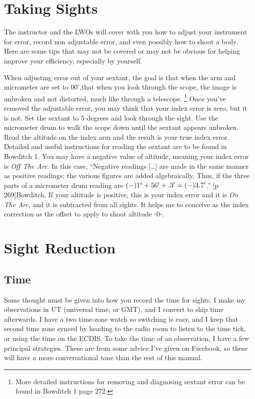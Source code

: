 \documentclass[letterpaper,12pt]{article}
\begin{document}
\section{Taking Sights}
The instructor and the LWOs will cover with you how to adjust your instrument for error, record non adjustable error, and even possibly how to shoot a body.
Here are some tips that may not be covered or may not be obvious for helping improve your efficiency, especially by yourself.

When adjusting error out of your sextant, the goal is that when the arm and micrometer are set to 00',that when you look through the scope, the image is unbroken and not distorted, much like through a telescope. 
\footnote{More detailed instructions for removing and diagnosing sextant error can be found in Bowditch 1 page 272.}
Once you've removed the adjustable error, you may think that your index error is zero, but it is not.
Set the sextant to 5 degrees and look through the sight. Use the micrometer drum to walk the scope down until the sextant appears unbroken.
Read the altitude on the index arm and the result is your true index error.
Detailed and useful instructions for reading the sextant are to be found in Bowditch 1.
You may have a negative value of altitude, meaning your index error is \emph{Off The Arc}.
In this case, ``Negative readings [\ldots] are made in the same manner as positive readings; the various figures are added algebraically. 
Thus, if the three parts of a micrometer drum reading are \((-)1\degree{}+56'+.3'=(-)3.7'\).'' [p 269]{Bowditch}.
If your altitude is positive, this is your index error and it is \emph{On The Arc}, and it is subtracted from all sights.
It helps me to conceive as the index correction as the offset to apply to shoot altitude -0-.
\section{Sight Reduction}
\subsection{Time}
Some thought must be given into how you record the time for sights.
I make my observations in UT (universal time, or GMT), and I convert to ship time afterwards.
I have a two time-zone watch so switching is easy, and I keep that second time zone synced by heading to the radio room to listen to the time tick, or using the time on the ECDIS.
To take the time of an observation, I have a few principal strategies.
These are from some advice I've given on Facebook, so these will have a more conversational tone than the rest of this manual.
\end{document}

